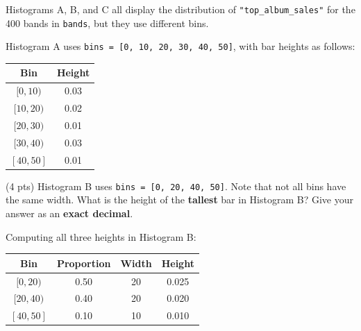 \documentclass[twoside,12pt]{article}
\begin{document}
\begin{probset}
\begin{prob}[(17 pts)]
\begin{subprobset}
\begin{subprob}

\smallskip

\end{subprob}

\end{subprobset}

\end{prob}


\newpage

\begin{prob}[(8 pts)]
Histograms A, B, and C all display the distribution of \texttt{"top\_album\_sales"} for the 400 bands in \texttt{bands}, but they use different bins.

\smallskip

Histogram A uses \texttt{bins = [0, 10, 20, 30, 40, 50]}, with bar heights as follows:

\smallskip

\begin{center}
\renewcommand{\arraystretch}{1.5}
\begin{tabular}{cc}
\toprule
Bin & Height \\
\midrule
$[0, 10)$ & 0.03 \\
$[10, 20)$ & 0.02 \\
$[20, 30)$ & 0.01 \\
$[30, 40)$ & 0.03 \\
$[40, 50]$ & 0.01 \\
\bottomrule
\end{tabular}
\end{center}

\smallskip



\begin{subprobset}

\begin{subprob}(4 pts)
Histogram B uses \texttt{bins = [0, 20, 40, 50]}. Note that not all bins have the same width. What is the height of the \textbf{tallest} bar in Histogram B? Give your answer as an \textbf{exact decimal}.

\smallskip
\begin{center}
\end{center}

\begin{soln}

\smallskip
Computing all three heights in Histogram B:

\smallskip
\begin{center}
\begin{tabular}{cccc}
\toprule
Bin & Proportion & Width & Height \\
\midrule
$[0, 20)$  & 0.50 & 20 & 0.025 \\
$[20, 40)$ & 0.40 & 20 & 0.020 \\
$[40, 50]$ & 0.10 & 10 & 0.010 \\
\bottomrule
\end{tabular}
\end{center}


\end{soln}
\end{subprob}
\end{subprobset}
\end{prob}
\end{probset}
\end{document}
